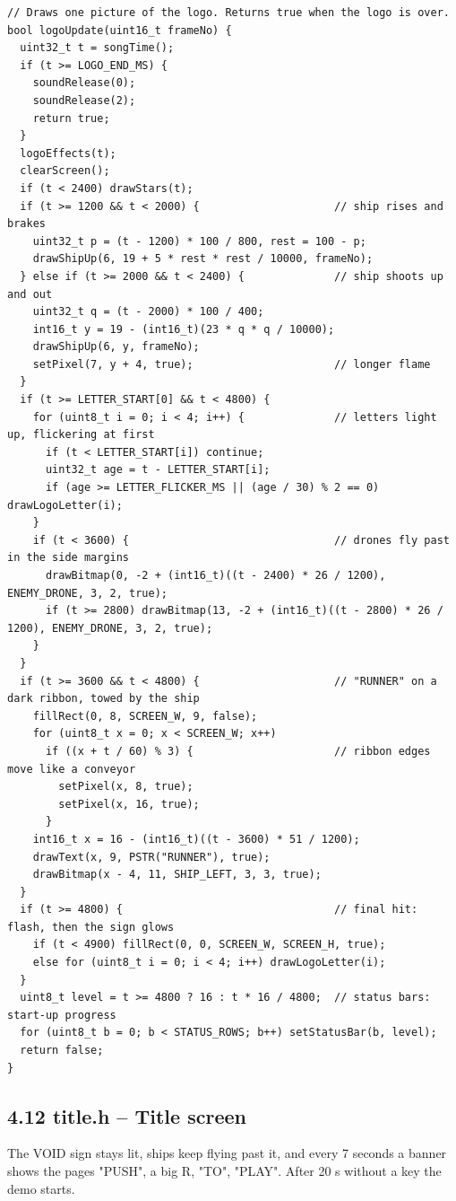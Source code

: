 \documentclass[11pt,a4paper]{article}
\begin{document}
\begin{lstlisting}[language=Arduino]
// Draws one picture of the logo. Returns true when the logo is over.
bool logoUpdate(uint16_t frameNo) {
  uint32_t t = songTime();
  if (t >= LOGO_END_MS) {
    soundRelease(0);
    soundRelease(2);
    return true;
  }
  logoEffects(t);
  clearScreen();
  if (t < 2400) drawStars(t);
  if (t >= 1200 && t < 2000) {                     // ship rises and brakes
    uint32_t p = (t - 1200) * 100 / 800, rest = 100 - p;
    drawShipUp(6, 19 + 5 * rest * rest / 10000, frameNo);
  } else if (t >= 2000 && t < 2400) {              // ship shoots up and out
    uint32_t q = (t - 2000) * 100 / 400;
    int16_t y = 19 - (int16_t)(23 * q * q / 10000);
    drawShipUp(6, y, frameNo);
    setPixel(7, y + 4, true);                      // longer flame
  }
  if (t >= LETTER_START[0] && t < 4800) {
    for (uint8_t i = 0; i < 4; i++) {              // letters light up, flickering at first
      if (t < LETTER_START[i]) continue;
      uint32_t age = t - LETTER_START[i];
      if (age >= LETTER_FLICKER_MS || (age / 30) % 2 == 0) drawLogoLetter(i);
    }
    if (t < 3600) {                                // drones fly past in the side margins
      drawBitmap(0, -2 + (int16_t)((t - 2400) * 26 / 1200), ENEMY_DRONE, 3, 2, true);
      if (t >= 2800) drawBitmap(13, -2 + (int16_t)((t - 2800) * 26 / 1200), ENEMY_DRONE, 3, 2, true);
    }
  }
  if (t >= 3600 && t < 4800) {                     // "RUNNER" on a dark ribbon, towed by the ship
    fillRect(0, 8, SCREEN_W, 9, false);
    for (uint8_t x = 0; x < SCREEN_W; x++)
      if ((x + t / 60) % 3) {                      // ribbon edges move like a conveyor
        setPixel(x, 8, true);
        setPixel(x, 16, true);
      }
    int16_t x = 16 - (int16_t)((t - 3600) * 51 / 1200);
    drawText(x, 9, PSTR("RUNNER"), true);
    drawBitmap(x - 4, 11, SHIP_LEFT, 3, 3, true);
  }
  if (t >= 4800) {                                 // final hit: flash, then the sign glows
    if (t < 4900) fillRect(0, 0, SCREEN_W, SCREEN_H, true);
    else for (uint8_t i = 0; i < 4; i++) drawLogoLetter(i);
  }
  uint8_t level = t >= 4800 ? 16 : t * 16 / 4800;  // status bars: start-up progress
  for (uint8_t b = 0; b < STATUS_ROWS; b++) setStatusBar(b, level);
  return false;
}
\end{lstlisting}

\clearpage
\subsection*{4.12 title.h – Title screen}
The VOID sign stays lit, ships keep flying past it, and every 7 seconds a banner shows the pages "PUSH", a big R, "TO", "PLAY". After 20 s without a key the demo starts.
\end{document}
